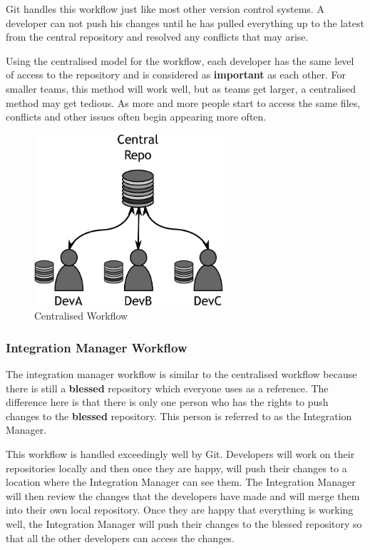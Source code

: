 Git handles this workflow just like most other version control systems.
A developer can not push his changes until he has pulled everything up to the latest from the central repository and resolved any conflicts that may arise.

Using the centralised model for the workflow, each developer has the same level of access to the repository and is considered as \textbf{important} as each other.
For smaller teams, this method will work well, but as teams get larger, a centralised method may get tedious.
As more and more people start to access the same files, conflicts and other issues often begin appearing more often.

\begin{figure}[bt]
	\centering
	\includegraphics[width=7cm]{images/f-w1-d1.pdf}
	\caption{Centralised Workflow}
\end{figure}

\subsubsection{Integration Manager Workflow}
The integration manager workflow is similar to the centralised workflow because there is still a \textbf{blessed} repository which everyone uses as a reference.
The difference here is that there is only one person who has the rights to push changes to the \textbf{blessed} repository.
This person is referred to as the Integration Manager.

This workflow is handled exceedingly well by Git.
Developers will work on their repositories locally and then once they are happy, will push their changes to a location where the Integration Manager can see them.
The Integration Manager will then review the changes that the developers have made and will merge them into their own local repository.
Once they are happy that everything is working well, the Integration Manager will push their changes to the blessed repository so that all the other developers can access the changes.

